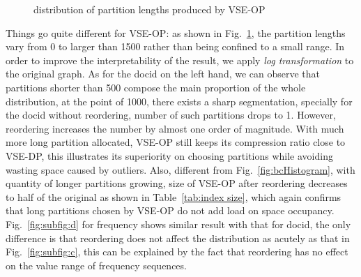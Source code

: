 \documentclass[runningheads,a4paper]{llncs}
\begin{document}
\begin{figure}
	\centering
	\caption[distribution of partition lengths 2]{distribution of partition lengths produced by VSE-OP}
	\label{fig:bcScatter}
\end{figure}

Things go quite different for VSE-OP: as shown in Fig.~\ref{fig:bcScatter}, the partition lengths vary from 0 to larger than 1500 rather than being confined to a small range. In order to improve the interpretability of the result, we apply \textit{log transformation} to the original graph. As for the docid on the left hand, we can observe that partitions shorter than 500 compose the main proportion of the whole distribution, at the point of 1000, there exists a sharp segmentation, specially for the docid without reordering, number of such partitions drops to 1. However, reordering increases the number by almost one order of magnitude. With much more long partition allocated, VSE-OP still keeps its compression ratio close to VSE-DP, this  illustrates its superiority on choosing partitions while avoiding wasting space caused by outliers. Also, different from Fig.~\ref{fig:bcHistogram}, with quantity of longer partitions growing, size of VSE-OP after reordering decreases to half of the original as shown in Table~\ref{tab:index size}, which again confirms that long partitions chosen by VSE-OP do not add load on space occupancy. Fig.~\ref{fig:subfig:d} for frequency shows similar result with that for docid, the only difference is that reordering does not affect the distribution as acutely as that in Fig.~\ref{fig:subfig:c}, this can be explained by the fact that reordering has no effect on the value range of frequency sequences.
\end{document}
